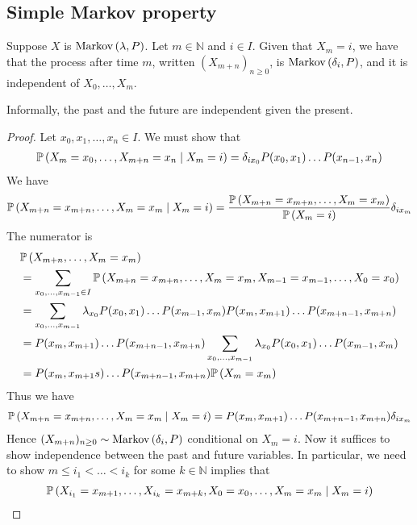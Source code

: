 \subsection{Simple Markov property}
\begin{theorem}
	Suppose $X$ is $\operatorname{Markov}\left({\lambda, P}\right)$.
	Let $m \in \mathbb N$ and $i \in I$.
	Given that $X_m = i$, we have that the process after time $m$, written $(X_{m+n})_{n \geq 0}$, is $\operatorname{Markov}\left({\delta_i, P}\right)$, and it is independent of $X_0, \dots, X_m$.
\end{theorem}
\noindent Informally, the past and the future are independent given the present.
\begin{proof}
	Let $x_0, x_1, \dots, x_n \in I$.
	We must show that
	\begin{align*}
		\mathbb{P}\left({X_m = x_0, \dots, X_{m+n} = x_n \mid X_m = i}\right) = \delta_{i x_0} P(x_0, x_1) \dots P(x_{n-1}, x_n)
	\end{align*}
	We have
	\begin{align*}
		\mathbb{P}\left({X_{m+n} = x_{m+n}, \dots, X_m = x_m \mid X_m = i}\right)
		= \frac{\mathbb{P}\left({X_{m+n} = x_{m+n}, \dots, X_m = x_m}\right)}{\mathbb{P}\left({X_m = i}\right)} \delta_{i x_m}
	\end{align*}
	The numerator is
	\begin{align*}
		& \mathbb{P}\left({X_{m+n}, \dots, X_m = x_m}\right)  \\ &= \sum_{x_0, \dots, x_{m-1} \in I} \mathbb{P}\left({X_{m+n} = x_{m+n}, \dots, X_m = x_m, X_{m-1} = x_{m-1}, \dots, X_0 = x_0}\right)       \\
		& = \sum_{x_0, \dots, x_{m-1}} \lambda_{x_0} P(x_0, x_1) \dots P(x_{m-1}, x_m) P(x_m, x_{m+1}) \dots P(x_{m+n-1}, x_{m+n}) \\
		& = P(x_m, x_{m+1}) \dots P(x_{m+n-1}, x_{m+n}) \sum_{x_0, \dots, x_{m-1}} \lambda_{x_0} P(x_0, x_1) \dots P(x_{m-1}, x_m) \\
		& = P(x_m, x_{m+1}s) \dots P(x_{m+n-1}, x_{m+n}) \mathbb{P}\left({X_m = x_m}\right)
	\end{align*}
	Thus we have
	\begin{align*}
		\mathbb{P}\left({X_{m+n} = x_{m+n}, \dots, X_m = x_m \mid X_m = i}\right)
		= P(x_m, x_{m+1}) \dots P(x_{m+n-1}, x_{m+n}) \delta_{i x_m}
	\end{align*}
	Hence $(X_{m+n})_{n \geq 0} \sim \operatorname{Markov}\left({\delta_i, P}\right)$ conditional on $X_m = i$.
	Now it suffices to show independence between the past and future variables.
	In particular, we need to show $m \leq i_1 < \dots < i_k$ for some $k \in \mathbb N$ implies that
	\begin{align*}
		 & \prob{X_{i_1} = x_{m+1}, \dots, X_{i_k} = x_{m+k}, X_0 = x_0, \dots, X_m = x_m \mid X_m = i} \\

\end{align*}
\end{proof}

